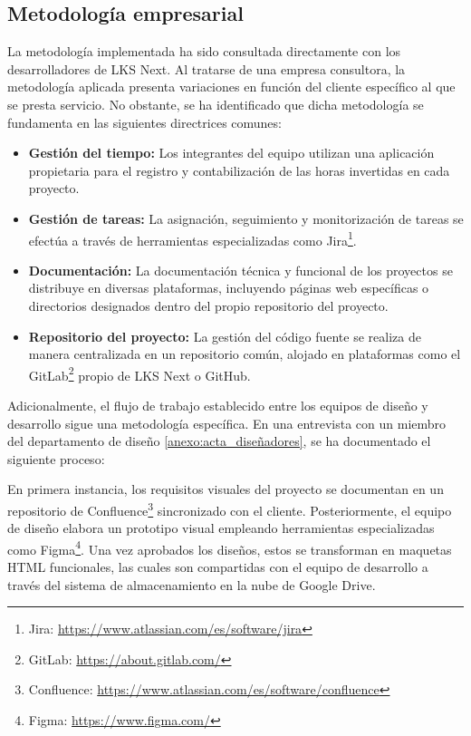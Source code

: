 \subsection{Metodología empresarial}
La metodología implementada ha sido consultada directamente con los desarrolladores de LKS Next. Al tratarse de una empresa consultora, la metodología aplicada presenta variaciones en función del cliente específico al que se presta servicio. No obstante, se ha identificado que dicha metodología se fundamenta en las siguientes directrices comunes:
\begin{itemize}
\item\textbf{Gestión del tiempo: }Los integrantes del equipo utilizan una aplicación propietaria para el registro y contabilización de las horas invertidas en cada proyecto.
\item\textbf{Gestión de tareas: }La asignación, seguimiento y monitorización de tareas se efectúa a través de herramientas especializadas como Jira\footnote{Jira: \url{https://www.atlassian.com/es/software/jira}}.
\item\textbf{Documentación: }La documentación técnica y funcional de los proyectos se distribuye en diversas plataformas, incluyendo páginas web específicas o directorios designados dentro del propio repositorio del proyecto.
\item\textbf{Repositorio del proyecto: }La gestión del código fuente se realiza de manera centralizada en un repositorio común, alojado en plataformas como el GitLab\footnote{GitLab: \url{https://about.gitlab.com/}} propio de LKS Next o GitHub.

\end{itemize}
Adicionalmente, el flujo de trabajo establecido entre los equipos de diseño y desarrollo sigue una metodología específica. En una entrevista con un miembro del departamento de diseño \ref{anexo:acta_diseñadores}, se ha documentado el siguiente proceso:

En primera instancia, los requisitos visuales del proyecto se documentan en un repositorio de Confluence\footnote{Confluence: \url{https://www.atlassian.com/es/software/confluence}} sincronizado con el cliente. Posteriormente, el equipo de diseño elabora un prototipo visual empleando herramientas especializadas como Figma\footnote{Figma: \url{https://www.figma.com/}}. Una vez aprobados los diseños, estos se transforman en maquetas HTML funcionales, las cuales son compartidas con el equipo de desarrollo a través del sistema de almacenamiento en la nube de Google Drive.



